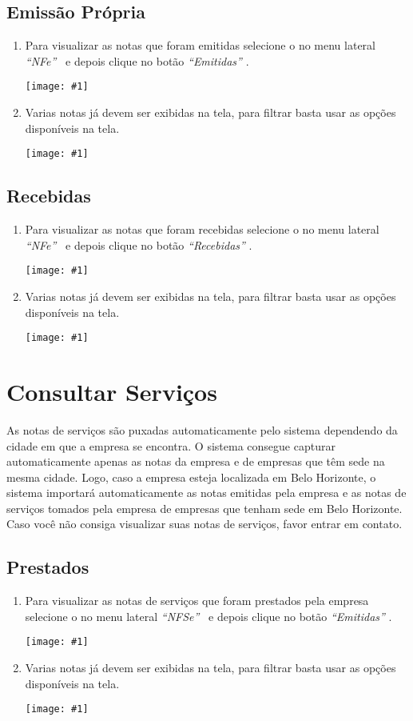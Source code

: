 \documentclass{article}
\newcommand{\itasp}[1]{
  \textit{``#1''}
}
\newcommand{\imagem}[2]{
  \begin{center}
    \texttt{[image: \#1]}
  \end{center}
}
\begin{document}
  \subsection{Emissão Própria}
  \begin{enumerate}
    \item Para visualizar as notas que foram emitidas selecione o no menu lateral \itasp{NFe} \ e depois clique no botão \itasp{Emitidas}. \imagem{menu-nfe.PNG}{.25}
    \item Varias notas já devem ser exibidas na tela, para filtrar basta usar as opções disponíveis na tela. \imagem{filtro-nfe-emit.PNG}{1}
  \end{enumerate}
  
  \subsection{Recebidas}
  \begin{enumerate}
    \item Para visualizar as notas que foram recebidas selecione o no menu lateral \itasp{NFe} \ e depois clique no botão \itasp{Recebidas}. \imagem{menu-nfe.PNG}{.25}
    \item Varias notas já devem ser exibidas na tela, para filtrar basta usar as opções disponíveis na tela. \imagem{filtro-nfe-rec.PNG}{1}
  \end{enumerate}
  
  \section{Consultar Serviços}
  \label{sec:servicos-nfstock}
  As notas de serviços são puxadas automaticamente pelo sistema dependendo da cidade em que a empresa se encontra. O sistema consegue capturar automaticamente apenas as notas da empresa e de empresas que têm sede na mesma cidade. Logo, caso a empresa esteja localizada em Belo Horizonte, o sistema importará automaticamente as notas emitidas pela empresa e as notas de serviços tomados pela empresa de empresas que tenham sede em Belo Horizonte. Caso você não consiga visualizar suas notas de serviços, favor entrar em contato.
  
  \subsection{Prestados}
  \begin{enumerate}
    \item Para visualizar as notas de serviços que foram prestados pela empresa selecione o no menu lateral \itasp{NFSe} \ e depois clique no botão \itasp{Emitidas}. \imagem{menu-nfe.PNG}{.2}
    \item Varias notas já devem ser exibidas na tela, para filtrar basta usar as opções disponíveis na tela. \imagem{filtro-nfse-emit.PNG}{.9}
  \end{enumerate}
  
\end{document}
